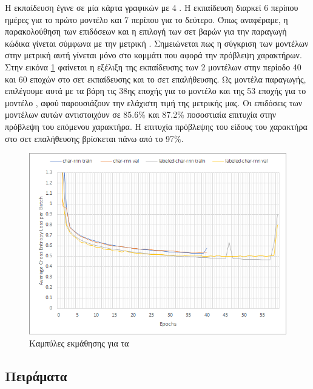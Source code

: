 Η εκπαίδευση έγινε σε μία κάρτα γραφικών  με 4 .
Η εκπαίδευση διαρκεί 6 περίπου ημέρες για το πρώτο μοντέλο και 7 περίπου για το δεύτερο.
Όπως αναφέραμε, η παρακολούθηση των επιδόσεων και η επιλογή των σετ βαρών για την παραγωγή κώδικα γίνεται σύμφωνα με την μετρική .
Σημειώνεται πως η σύγκριση των μοντέλων στην μετρική αυτή γίνεται μόνο στο κομμάτι που αφορά την πρόβλεψη χαρακτήρων.
Στην εικόνα \ref{training1} φαίνεται η εξέλιξη της εκπαίδευσης των 2 μοντέλων στην περίοδο 40 και 60 εποχών στο σετ εκπαίδευσης και το σετ επαλήθευσης. 
Ως μοντέλα παραγωγής, επιλέγουμε αυτά με τα βάρη τις 38ης εποχής για το μοντέλο  και της 53 εποχής για το μοντέλο , αφού παρουσιάζουν την ελάχιστη τιμή της μετρικής μας.
Οι επιδόσεις των μοντέλων αυτών αντιστοιχόυν σε 85.6\% και 87.2\% ποσοστιαία επιτυχία στην πρόβλεψη του επόμενου χαρακτήρα.
Η επιτυχία πρόβλεψης του είδους του χαρακτήρα στο σετ επαλήθευσης βρίσκεται πάνω από το 97\%.   

\begin{figure}[h]
	\includegraphics[trim = 2 2 2 2, clip, keepaspectratio]{images/training1.png}
	\centering
	\caption{Καμπύλες εκμάθησης για τα }
	\label{training1}
\end{figure}

\subsection{ Πειράματα}

